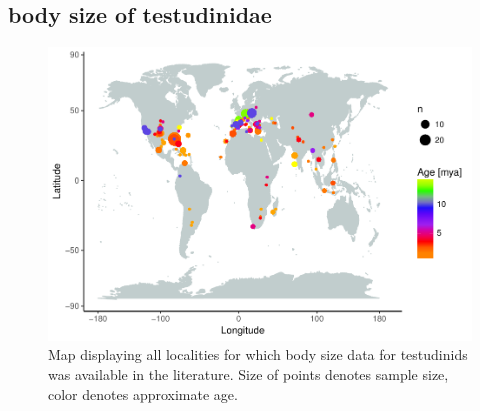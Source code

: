 \documentclass[]{article}
\begin{document}
\newpage

\subsection{body size of testudinidae}\label{body-size-of-testudinidae}

\begin{figure}[htbp]
\centering
\includegraphics{MA_JJ_files/figure-latex/MapCL-1.pdf}
\caption{Map displaying all localities for which body size data for
testudinids was available in the literature. Size of points denotes
sample size, color denotes approximate age.}
\end{figure}
\end{document}
